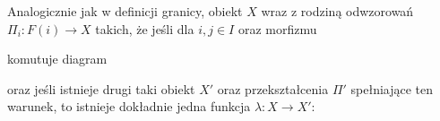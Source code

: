 \begin{definition}
  Analogicznie jak w definicji granicy, obiekt $X$ wraz z rodziną odwzorowań $\Pi_i:F(i)\to X$ takich, że jeśli dla $i,j\in I$ oraz morfizmu  komutuje diagram
  \begin{center}\end{center}
  oraz jeśli istnieje drugi taki obiekt $X'$ oraz przekształcenia $\Pi'$ spełniające ten warunek, to istnieje dokładnie jedna funkcja $\lambda:X\to X'$:
  \begin{center}\end{center}
\end{definition}

